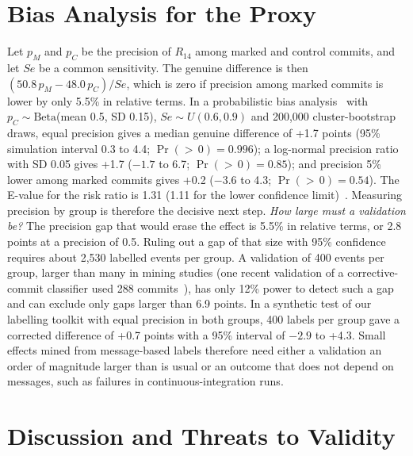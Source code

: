 \documentclass[runningheads]{llncs}
\begin{document}
\section{Bias Analysis for the Proxy}\label{sec:proxy}
Let $p_M$ and $p_C$ be the precision of $R_{14}$ among marked and control commits, and let $\mathit{Se}$ be a common sensitivity. The genuine difference is then $(50.8\,p_M - 48.0\,p_C)/\mathit{Se}$, which is zero if precision among marked commits is lower by only 5.5\% in relative terms. In a probabilistic bias analysis~\cite{lash2009} with $p_C \sim \mathrm{Beta}$(mean 0.5, SD 0.15), $\mathit{Se} \sim U(0.6, 0.9)$ and 200,000 cluster-bootstrap draws, equal precision gives a median genuine difference of +1.7 points (95\% simulation interval 0.3 to 4.4; $\Pr({>}\,0) = 0.996$); a log-normal precision ratio with SD 0.05 gives +1.7 ($-1.7$ to 6.7; $\Pr({>}\,0) = 0.85$); and precision 5\% lower among marked commits gives +0.2 ($-3.6$ to 4.3; $\Pr({>}\,0) = 0.54$). The E-value for the risk ratio is 1.31 (1.11 for the lower confidence limit)~\cite{vanderweele2017}. Measuring precision by group is therefore the decisive next step. \textit{How large must a validation be?} The precision gap that would erase the effect is 5.5\% in relative terms, or 2.8 points at a precision of 0.5. Ruling out a gap of that size with 95\% confidence requires about 2,530 labelled events per group. A validation of 400 events per group, larger than many in mining studies (one recent validation of a corrective-commit classifier used 288 commits~\cite{khosravani2026}), has only 12\% power to detect such a gap and can exclude only gaps larger than 6.9 points. In a synthetic test of our labelling toolkit with equal precision in both groups, 400 labels per group gave a corrected difference of +0.7 points with a 95\% interval of $-2.9$ to +4.3. Small effects mined from message-based labels therefore need either a validation an order of magnitude larger than is usual or an outcome that does not depend on messages, such as failures in continuous-integration runs.

\section{Discussion and Threats to Validity}
\end{document}
